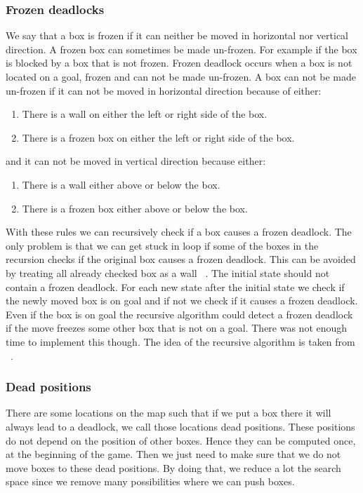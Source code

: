 \documentclass[a4paper,10pt]{article}
\begin{document}
	  \subsubsection{Frozen deadlocks}
	    We say that a box is frozen if it can neither be moved in horizontal nor vertical direction.  
	    A frozen box can sometimes be made un-frozen.  For example if the box is blocked by a box that is not frozen.  
	    Frozen deadlock occurs when a box is not located on a goal, frozen and can not be made un-frozen.  
	    A box can not be made un-frozen if it can not be moved in horizontal direction because of either:
	
	    \begin{enumerate}[I]
                \item There is a wall on either the left or right side of the box.
                \item There is a frozen box on either the left or right side of the box.
            \end{enumerate}
            and it can not be moved in vertical direction because either: 
            \begin{enumerate}[I]
                \item There is a wall either above or below the box.
                \item There is a frozen box either above or below the box.
            \end{enumerate}
            With these rules we can recursively check if a box causes a frozen deadlock.  
            The only problem is that we can get stuck in loop if some of the boxes in the recursion checks if the original box causes a frozen deadlock.  
            This can be avoided by treating all already checked box as a wall ~\cite{frozen_deadlock}.    
            The initial state should not contain a frozen deadlock.  
            For each new state after the initial state we check if the newly moved box is on goal and if not we check if it causes a frozen deadlock. 
            Even if the box is on goal the recursive algorithm could detect a frozen deadlock if the move freezes some other box that is not on a goal.  
            There was not enough time to implement this though.  
            The idea of the recursive algorithm is taken from  ~\cite{frozen_deadlock}.
          \subsubsection{Dead positions}
            There are some locations on the map such that if we put a box there it will always lead to a deadlock, we call those locations dead positions.  
			These positions do not depend on the position of other boxes.
			Hence they can be computed once, at the beginning of the game.
            Then we just need to make sure that we do not move boxes to these dead positions. 
            By doing that, we reduce a lot the search space since we remove many possibilities where we can push boxes.
			
\end{document}
